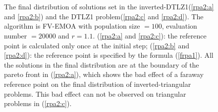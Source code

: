 \documentclass[conference]{IEEEtran}
\begin{document}
\begin{figure}[!t]
  \centering
  \quad
  \\
  \quad
  \\
  \caption{The final distribution of solutions set in the inverted-DTLZ1(\ref{rpa2:a} and \ref{rpa2:b}) 
  and the DTLZ1 problem(\ref{rpa2:c} and \ref{rpa2:d}).
  The algorithm is FV-EMOA with population size $= 100$, evaluation number $= 20000$ and $r=1.1$. 
  (\ref{rpa2:a} and \ref{rpa2:c}): the reference point is calculated only once at the initial step;
  (\ref{rpa2:b} and \ref{rpa2:d}): the reference point is specified by the formula (\ref{frpa1}).
  All the solutions in the final distribution are at the boundary of the pareto front in (\ref{rpa2:a}),
  which shows the bad effect of a faraway reference point
  on the final distribution of inverted-triangular problems.
  This bad effect can not be observed on triangular problems in (\ref{rpa2:c}).
  }
  \label{rpa2}
\end{figure}
\end{document}
